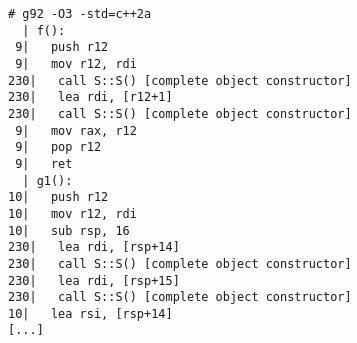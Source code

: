 \begin{lstlisting}[language={},numbers=none,title=\href{https://godbolt.org/z/Yoggsd}{\texttt{godbolt.org/z/Yoggsd}}]
# g92 -O3 -std=c++2a
  | f():
 9|   push r12
 9|   mov r12, rdi
230|   call S::S() [complete object constructor]
230|   lea rdi, [r12+1]
230|   call S::S() [complete object constructor]
 9|   mov rax, r12
 9|   pop r12
 9|   ret
  | g1():
10|   push r12
10|   mov r12, rdi
10|   sub rsp, 16
230|   lea rdi, [rsp+14]
230|   call S::S() [complete object constructor]
230|   lea rdi, [rsp+15]
230|   call S::S() [complete object constructor]
10|   lea rsi, [rsp+14]
[...]
\end{lstlisting}
